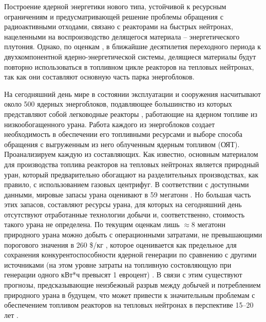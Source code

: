 {\actuality}

Построение ядерной энергетики нового типа, устойчивой к ресурсным ограничениям и предусматривающей решение проблемы обращения с радиоактивными отходами, связано с реакторами на быстрых нейтронах, нацеленными на воспроизводство делящегося материала -- энергетического  плутония. Однако, по оценкам \cite{andrianovaPerspektivnyeToplivnyeZagruzki2015}, в ближайшие десятилетия переходного периода к двухкомпонентной ядерно-энергетической системы, делящиеся материалы будут повторно использоваться в топливном цикле реакторов на тепловых нейтронах, так как они составляют основную часть парка энергоблоков.

На сегодняшний день мире в состоянии эксплуатации и сооружения насчитывают около 500 ядерных энергоблоков, подавляющее большинство из которых представляют собой легководные реакторы \cite{PRISHome}, работающие на ядерном топливе из низкообогащенного урана. Работа каждого из энергоблоков создает необходимость в обеспечении его топливными ресурсами и выборе способа обращения с выгруженным из него облученным ядерным топливом (ОЯТ). Проанализируем каждую из составляющих. 
Как известно, основным материалом для производства топлива реакторов на тепловых нейтронах является природный уран, который предварительно обогащают на разделительных производствах, как правило, с использованием газовых центрифуг. В соответствии с доступными данными, мировые запасы урана  оценивают в 59 мегатонн \cite{/content/publication/d82388ab-en}. Но большая часть этих запасов, составляют ресурсы урана, для которых на сегодняшний день отсутствуют отработанные технологии добычи и, соответственно, стоимость такого урана не определена. По текущим оценкам лишь $\approx$8 мегатонн природного урана можно добыть с операционными затратами, не превышающими порогового значения в 260 \$/кг \cite{WorldDistributionUranium2018}, которое оценивается как предельное для сохранения конкурентоспособности ядерной генерации по сравнению с другими источниками (на этом уровне затраты на топливную состовляющую при генерации одного кВт*ч превысят 1 евроцент) \cite{hartardCompetitionConflictsResource2015}. В связи с этим существуют прогнозы, предсказывающие неизбежный разрыв между добычей и потреблением природного урана в будущем, что может привести к значительным проблемам  с обеспечением топливом реакторов на тепловых нейтронах в перспективе 15--20 лет \cite{international2019iaea}.

